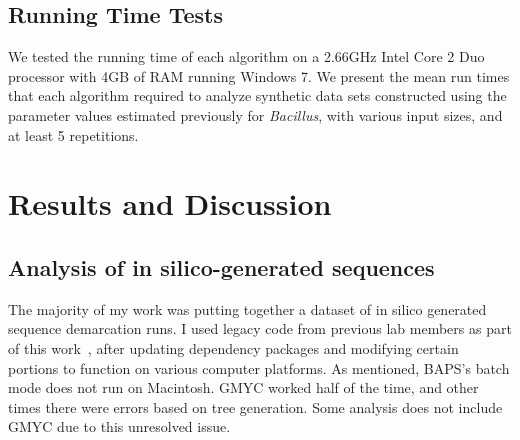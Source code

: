 \subsection*{Running Time Tests}
We tested the running time of each algorithm on a 2.66GHz Intel Core 2 Duo processor with 4GB of RAM running Windows 7.
We present the mean run times that each algorithm required to analyze synthetic data sets constructed using the parameter values estimated previously for \emph{Bacillus}, with various input sizes, and at least 5 repetitions.

\section{Results and Discussion}


\subsection*{Analysis of in silico-generated sequences}
The majority of my work was putting together a dataset of in silico generated sequence demarcation runs.
I used legacy code from previous lab members as part of this work~\cite{carlo}, after updating dependency packages and modifying certain portions to function on various computer platforms.
As mentioned, BAPS's batch mode does not run on Macintosh.
GMYC worked half of the time, and other times there were errors based on tree generation.
Some analysis does not include GMYC due to this unresolved issue.

